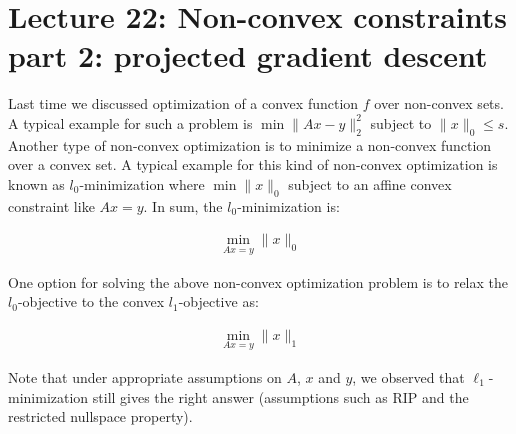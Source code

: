 

\section{Lecture 22: Non-convex constraints part 2: projected gradient descent} 


Last time we discussed optimization of a convex function $f$ over non-convex sets. A typical example for such a problem is $\min \| Ax-y\|_2^2$ subject to $\|x\|_0 \leq s$. Another type of non-convex optimization is to minimize a non-convex function over a convex set. A typical example for this kind of non-convex optimization is known as $l_0$-minimization where $\min \| x\|_0$ subject to an affine convex constraint like $Ax=y$. In sum, the $l_0$-minimization is: 

\begin{align*}
\min_{Ax=y} \|x\|_0
\end{align*}

One option for solving the above non-convex optimization problem is to relax the $l_0$-objective to the convex $l_1$-objective as:

\begin{align*}
\min_{Ax=y} \|x\|_1
\end{align*}





Note that under appropriate assumptions on $A$, $x$ and $y$, we observed that $\ell_1$-minimization still gives the right answer (assumptions such as RIP and the restricted nullspace property).




